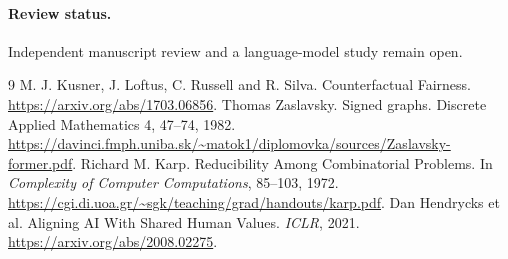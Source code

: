 \documentclass[11pt]{article}
\begin{document}
\paragraph{Review status.} Independent manuscript review and a language-model study remain open.

\begin{thebibliography}{9}
 M. J. Kusner, J. Loftus, C. Russell and R. Silva.
Counterfactual Fairness. \url{https://arxiv.org/abs/1703.06856}.
 Thomas Zaslavsky. Signed graphs.
Discrete Applied Mathematics 4, 47--74, 1982.
\url{https://davinci.fmph.uniba.sk/~matok1/diplomovka/sources/Zaslavsky-former.pdf}.
 Richard M. Karp. Reducibility Among Combinatorial
Problems. In \emph{Complexity of Computer Computations},
85--103, 1972.
\url{https://cgi.di.uoa.gr/~sgk/teaching/grad/handouts/karp.pdf}.
 Dan Hendrycks et al.
Aligning AI With Shared Human Values. \emph{ICLR}, 2021.
\url{https://arxiv.org/abs/2008.02275}.
\end{thebibliography}
\end{document}
